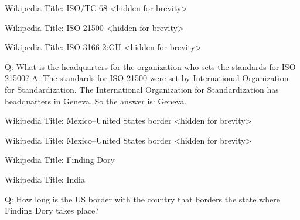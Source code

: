 \documentclass[
]{article}
\newenvironment{Shaded}{}{}
\newcommand{\NormalTok}[1]{#1}
\begin{document}
\begin{Shaded}
\begin{Highlighting}[]
\NormalTok{Wikipedia Title: ISO/TC 68}
\NormalTok{\textless{}hidden for brevity\textgreater{} }
\end{Highlighting}
\end{Shaded}

\begin{Shaded}
\begin{Highlighting}[]
\NormalTok{Wikipedia Title: ISO 21500}
\NormalTok{\textless{}hidden for brevity\textgreater{} }
\end{Highlighting}
\end{Shaded}

\begin{Shaded}
\begin{Highlighting}[]
\NormalTok{Wikipedia Title: ISO 3166{-}2:GH}
\NormalTok{\textless{}hidden for brevity\textgreater{} }
\end{Highlighting}
\end{Shaded}

\begin{Shaded}
\begin{Highlighting}[]
\NormalTok{Q: What is the headquarters for the organization who sets the standards for ISO 21500?}
\NormalTok{A: The standards for ISO 21500 were set by International Organization for Standardization. The International Organization for Standardization has headquarters in Geneva. So the answer is: Geneva. }
\end{Highlighting}
\end{Shaded}

\begin{Shaded}
\begin{Highlighting}[]
\NormalTok{Wikipedia Title: Mexico–United States border \textless{}hidden for brevity\textgreater{} }
\end{Highlighting}
\end{Shaded}

\begin{Shaded}
\begin{Highlighting}[]
\NormalTok{Wikipedia Title: Mexico–United States border \textless{}hidden for brevity\textgreater{} }
\end{Highlighting}
\end{Shaded}

Wikipedia Title: Finding Dory

Wikipedia Title: India

Q: How long is the US border with the country that borders the state
where Finding Dory takes place?
\end{document}
